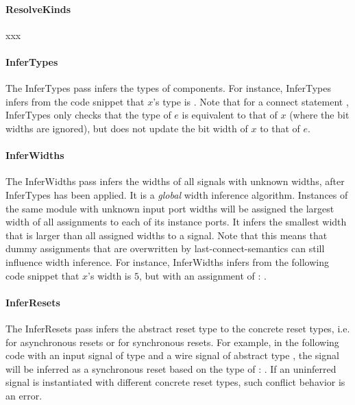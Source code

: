 \paragraph*{ResolveKinds} xxx 

\paragraph*{InferTypes} The InferTypes pass infers the types of components. For instance, InferTypes infers from the code snippet  that $x$'s type is . Note that for a connect statement   , InferTypes only checks that the type of $e$ is equivalent to that of $x$ (where the bit widths are ignored), but does not update the bit width of $x$ to that of $e$.

\paragraph*{InferWidths}
The InferWidths pass infers the widths of all signals with unknown widths, after InferTypes has been applied. It is a \emph{global} width inference algorithm. Instances of the same module with unknown input port widths will be assigned the largest width of all assignments to each of its instance ports. It infers the smallest width that is larger than all assigned widths to a signal. Note that this means that dummy assignments that are overwritten by last-connect-semantics can still influence width inference. For instance, InferWidths infers from the following code snippet that $x$'s width is $5$, but with an assignment of : 
.

\paragraph*{InferResets} %
The InferResets pass infers the abstract reset type  to the concrete reset types, i.e.  for asynchronous resets or  for synchronous resets. For example, in the following code with an input signal  of type  and a wire signal  of abstract type , the  signal will be inferred as a synchronous reset based on the type of : . If an uninferred signal is instantiated with different concrete reset types, such conflict behavior is an error.

